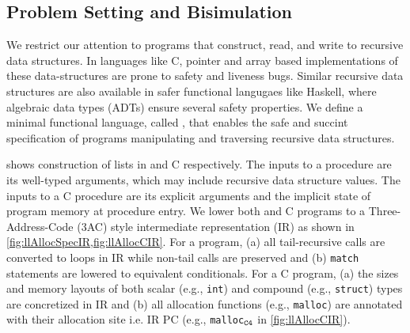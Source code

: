 \subsection{Problem Setting and Bisimulation}
\label{sec:syn-setting-bisimulation}
We restrict our attention to programs that construct, read, and write
to recursive data structures. In languages like C, pointer and array based
implementations of these data-structures are prone to safety and liveness bugs.
Similar recursive data structures are also available in safer functional langugaes like Haskell,
where algebraic data types (ADTs) \cite{hope} ensure several safety properties.
We define a minimal functional language, called \SpecL{}, that enables the safe
and succint specification of programs manipulating and traversing recursive data structures.




 shows construction of lists in \SpecL{} and C respectively.
The inputs to a \SpecL{} procedure are its well-typed arguments, which may include recursive data structure
values. The inputs to a C procedure are its explicit arguments and the implicit state of program memory
at procedure entry. We lower both \SpecL{} and C programs to a
Three-Address-Code (3AC) style intermediate representation (IR)
as shown in \cref{fig:llAllocSpecIR,fig:llAllocCIR}. For a \SpecL{} program,
(a) all tail-recursive calls are converted to loops in IR while non-tail calls are preserved and
(b) {\tt match} statements are lowered to equivalent \sumDtor{} conditionals.
For a C program, (a) the sizes and memory layouts of both scalar (e.g., {\tt int})
and compound (e.g., {\tt struct}) types are concretized in IR and
(b) all allocation functions (e.g., {\tt malloc}) are annotated with their
allocation site i.e. IR PC (e.g., {\tt malloc$_{\tt C4}$} in \cref{fig:llAllocCIR}).

